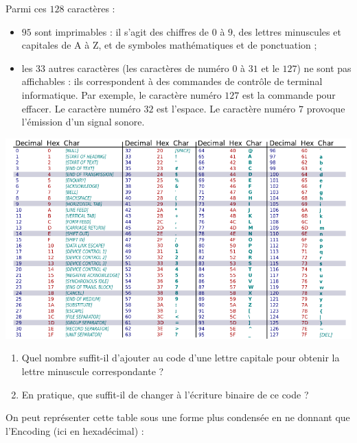 \documentclass[a4paper,dvipsnames]{article}
\begin{document}
\smallskip

Parmi ces $128$ caractères :

\begin{itemize}
  \item $95$ sont imprimables : il s'agit des chiffres de $0$ à $9$, des lettres minuscules et capitales de A à Z, et de symboles mathématiques et de ponctuation ;
  \item les $33$ autres caractères (les caractères de numéro $0$ à $31$ et le $127$) ne sont pas affichables : ils correspondent à des commandes de contrôle de terminal informatique. Par exemple, le caractère numéro $127$ est la commande pour effacer. Le caractère numéro $32$ est l'espace. Le caractère numéro $7$ provoque l'émission d'un signal sonore.
\end{itemize}

\begin{center}
  \includegraphics[width=16cm]{img/ascii-table.png}
\end{center}

\medskip

\begin{exercice}{}{}
  \begin{enumerate}
    \item Quel nombre suffit-il d'ajouter au code d'une lettre capitale pour obtenir la lettre minuscule correspondante ?
    \item En pratique, que suffit-il de changer à l'écriture binaire de ce code ?
  \end{enumerate}
\end{exercice}

\medskip

On peut représenter cette table sous une forme plus condensée en ne donnant que l'Encoding (ici en hexadécimal) :
\end{document}
